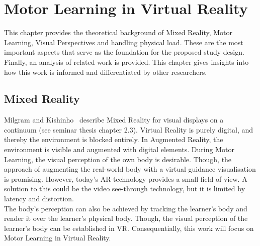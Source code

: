 \chapter{Motor Learning in Virtual Reality}
\label{chapter:theoretical_background}
This chapter provides the theoretical background of Mixed Reality, Motor Learning, Visual Perspectives and handling physical load. These are the most important aspects that serve as the foundation for the proposed study design. Finally, an analysis of related work is provided. This chapter gives insights into how this work is informed and differentiated by other researchers.

\section{Mixed Reality}
\label{section:mixed_reality}
Milgram and Kishinho~\cite{mrcontinuum} describe Mixed Reality for visual displays on a continuum (see seminar thesis chapter 2.3). Virtual Reality is purely digital, and thereby the environment is blocked entirely. In Augmented Reality, the environment is visible and augmented with digital elements. During Motor Learning, the visual perception of the own body is desirable. Though, the approach of augmenting the real-world body with a virtual guidance visualisation is promising. However, today's AR-technology provides a small field of view. A solution to this could be the video see-through technology, but it is limited by latency and distortion.\\
The body's perception can also be achieved by tracking the learner's body and render it over the learner's physical body. Though, the visual perception of the learner's body can be established in VR. Consequentially, this work will focus on Motor Learning in Virtual Reality.

